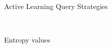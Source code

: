 \documentclass{beamer}
\begin{document}
\begin{frame}{Active Learning Query Strategies}
\begin{itemize}
\begin{table}
		~
		\begin{subtable}{.4\textwidth}
			\centering
			\caption{Entropy values}
			\label{vote3}
		\end{subtable}
		\caption{Vote entropy}
	\end{table}
	\end{itemize}
\end{frame}
\end{document}
